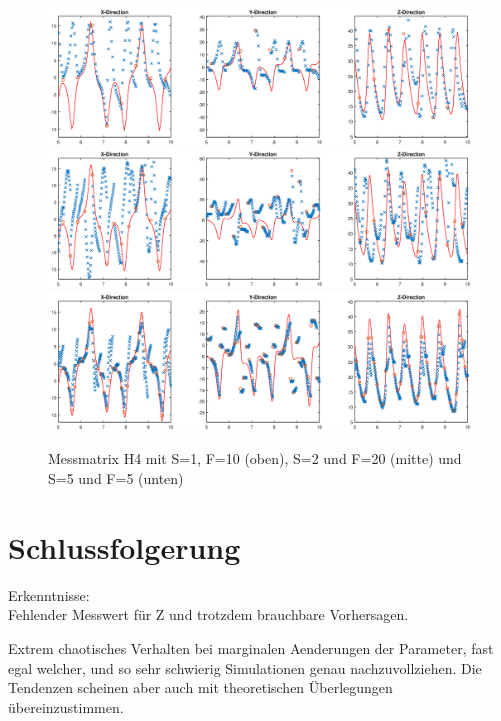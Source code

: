 \begin{refsection}
\begin{figure}
\centering
\includegraphics[width=\hsize]{kalman/figures/H4R10S1.eps}
\includegraphics[width=\hsize]{kalman/figures/H4R20S2.eps}
\includegraphics[width=\hsize]{kalman/figures/H4R05S5.eps}
\caption{Messmatrix H4 mit S=1, F=10 (oben), S=2 und F=20 (mitte) und S=5 und F=5 (unten)}
\label{skript:H4}
\end{figure}

\section{Schlussfolgerung}

Erkenntnisse:\\

Fehlender Messwert für Z und trotzdem brauchbare Vorhersagen.

Extrem chaotisches Verhalten bei marginalen Aenderungen der Parameter, fast egal welcher, und so sehr schwierig Simulationen genau nachzuvollziehen. Die Tendenzen scheinen aber auch mit theoretischen Überlegungen übereinzustimmen.

\printbibliography[heading=subbibliography]
\end{refsection}
